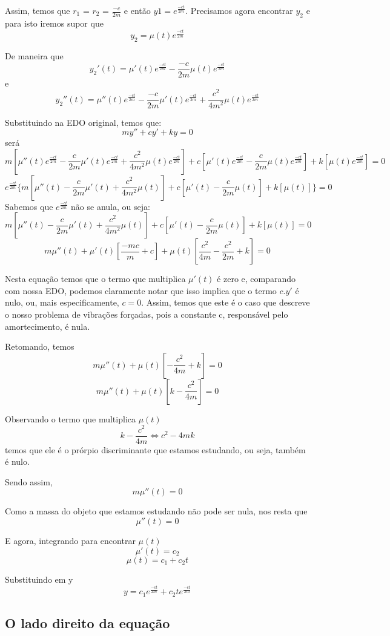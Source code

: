 \documentclass[12pt]{article}
\begin{document}
Assim, temos que $r_1$ = $r_2$ = $\frac{-c}{2m}$ e 
então $y1=e^{\frac{-ct}{2m}}$. Precisamos agora encontrar $y_2$ e para isto iremos supor que 
\[ y_2= \mu (t)e^{\frac{-ct}{2m}}\]

De maneira que
\[y_2'(t) = \mu '(t)e^{\frac{-ct}{2m}} -\frac{-c}{2m}\mu (t)e^{\frac{-ct}{2m}} \] 
e 
\[y_2''(t) = \mu ''(t)e^{\frac{-ct}{2m}} -\frac{-c}{2m}\mu '(t)e^{\frac{-ct}{2m}} + \frac{c^2}{4m^2}\mu (t)e^{\frac{-ct}{2m}}\]

Substituindo na EDO original, temos que:
\[ my'' + cy'  + ky = 0\]
será
\[ m[\mu ''(t)e^{\frac{-ct}{2m}} -\frac{c}{2m}\mu '(t)e^{\frac{-ct}{2m}} + \frac{c^2}{4m^2}\mu (t)e^{\frac{-ct}{2m}}] + c[\mu '(t)e^{\frac{-ct}{2m}} -\frac{c}{2m}\mu (t)e^{\frac{-ct}{2m}}] + k[\mu (t)e^{\frac{-ct}{2m}}] = 0\]
\[ e^{\frac{-ct}{2m}} \{m[\mu ''(t) - \frac{c}{2m}\mu '(t) + \frac{c^2}{4m^2}\mu (t)] + c[\mu '(t) -\frac{c}{2m}\mu (t)] + k[\mu (t)]\} = 0 \]
Sabemos que $e^{\frac{-ct}{2m}}$ não se anula, ou seja: 
\[m[\mu ''(t) - \frac{c}{2m}\mu '(t) + \frac{c^2}{4m^2}\mu (t)] + c[\mu '(t) -\frac{c}{2m}\mu (t)] + k[\mu (t)] = 0\]
\[ m\mu ''(t)  + \mu '(t)[\frac{-mc}{m} + c] + \mu (t) [\frac{c^2}{4m} - \frac{c^2}{2m} + k] = 0\]

Nesta equação temos que o termo que multiplica $\mu '(t)$ é zero e, comparando com nossa EDO, podemos claramente 
notar que isso implica que o termo $c.y'$ é  nulo, ou, mais especificamente, $c=0$. 
Assim, temos que este é o caso que descreve o nosso problema de vibrações 
forçadas, pois a constante c, responsável pelo amortecimento, é nula.

Retomando, temos
\[m\mu ''(t) + \mu (t) [ - \frac{c^2}{4m} + k] = 0\]
\[m\mu ''(t) + \mu (t) [k - \frac{c^2}{4m}] = 0\]

Observando o termo que multiplica $\mu(t)$
\[ k - \frac{c^2}{4m} \Leftrightarrow c^2 - 4mk\]
temos que ele é o prórpio discriminante que estamos estudando, ou seja, também é nulo.

Sendo assim, 
\[m\mu ''(t) = 0\]

Como a massa do objeto que estamos estudando não pode ser nula, nos resta que
\[\mu ''(t) = 0\]

E agora, integrando para encontrar $\mu(t)$
\[\mu '(t) = c_2\]
\[\mu (t) = c_1 + c_2t\]

Substituindo em y
\[ y= c_1e^{\frac{-ct}{2m}} + c_2te^{\frac{-ct}{2m}}\]
\subsection{O lado direito da equação}
\end{document}
